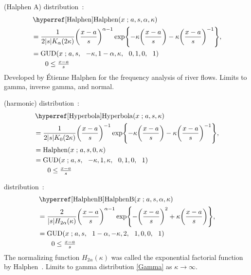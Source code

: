  (Halphen A) distribution~\cite{Halphen1941}:
\begin{align}
\label{Halphen}
&\opr{Halphen}(x\given a,s, \alpha, \kappa)
\\
&= \frac{1}{2 |s| K_{\alpha} (2\kappa)} \Left(\frac{x-a}{s}\Right)^{\alpha-1} 
\exp\Left\{-\kappa \Left(\frac{x-a}{s}\Right) -\kappa \Left(\frac{x-a}{s}\Right)^{-1}\Right\},
\checked
\notag
\\
 &=  \op{GUD}(x\given a,s \sep -\kappa, 1-\alpha, \kappa\sep 0,1,0 \sep 1)
\notag
\checked
\\& \qquad  0 \leq \tfrac{x-a}{s}
\notag
\end{align}
Developed by \'Etienne Halphen for the frequency analysis of river flows.
Limits to gamma, inverse gamma, and normal.



 (harmonic) distribution~\cite{Halphen1941,Perreault1999}:
\begin{align}
\label{Hyperbola}
&\opr{Hyperbola}(x\given a,s,\kappa)
\\ 
&= \frac{1}{2 |s| K_0(2\kappa)} \Left(\frac{x-a}{s}\Right)^{-1} 
\exp \Left\{ -\kappa \Left(\frac{x-a}{s}\Right) -\kappa \Left(\frac{x-a}{s}\Right)^{-1} \Right\},
\checked
\notag
\\
& = \op{Halphen}(x\given a,s, 0, \kappa)
\checked
\notag
\\
& = \op{GUD}(x\given a,s\sep -\kappa, 1 , \kappa\sep 0,1,0\sep 1)
\checked
\notag
\\& \qquad  0 \leq \tfrac{x-a}{s}
\notag
\end{align}




 distribution~\cite{Halphen1941,Perreault1999}:
\begin{align}
\label{HalphenB}
&\opr{HalphenB}(x\given a,s, \alpha, \kappa)
\\
&= \frac{2}{|s| H_{2 \alpha}(\kappa)} \Left(\frac{x-a}{s}\Right)^{\alpha-1} 
\exp\Left\{- \Left(\frac{x-a}{s}\Right)^{2} +\kappa \Left(\frac{x-a}{s}\Right)\Right\},
\checked
\notag
\\
& = \op{GUD}(x\given a,s\sep 1-\alpha, -\kappa,  2\sep 1,0,0\sep 1) \checked
\notag
\\& \qquad  0 \leq \tfrac{x-a}{s}
\notag
\end{align}
The normalizing function $H_{2 \alpha}(\kappa)$ was called the exponential factorial function by Halphen~\cite{Halphen1955a, Perreault1999}.
Limits to gamma distribution \eqref{Gamma} as $\kappa \rightarrow \infty$.


